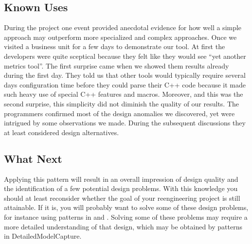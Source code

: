 \documentclass[a4paper,10pt,twoside]{book}
\begin{document}
\subsection*{Known Uses}

During the  project one event provided anecdotal evidence for how well a simple 
approach may outperform more specialized and complex approaches. Once we visited a business 
unit for a few days to demonstrate our  tool. At first the developers were 
quite sceptical because they felt like they would see ``yet another metrics tool''. The 
first surprise came when we showed them results already during the first day. They told us 
that other tools would typically require several days configuration time before they could 
parse their C++ code because it made such heavy use of special C++ features and macros. 
Moreover, and this was the second surprise, this simplicity did not diminish the quality of 
our results. The programmers confirmed most of the design anomalies we discovered, yet were 
intrigued by some observations we made. During the subsequent discussions they at least 
considered design alternatives.

\subsection*{What Next}

Applying this pattern will result in an overall impression of design quality and the 
identification of a few potential design problems. With this knowledge you should at least 
reconsider whether the goal of your reengineering project is still attainable. If it is, 
you will probably want to solve some of these design problems, for instance using patterns 
in  and 
. 
Solving some of these problems may require a more detailed understanding of that design, 
which may be obtained by patterns in 
{DetailedModelCapture}.

\ifx\wholebook\relax\else
   
   
   
\end{document}
